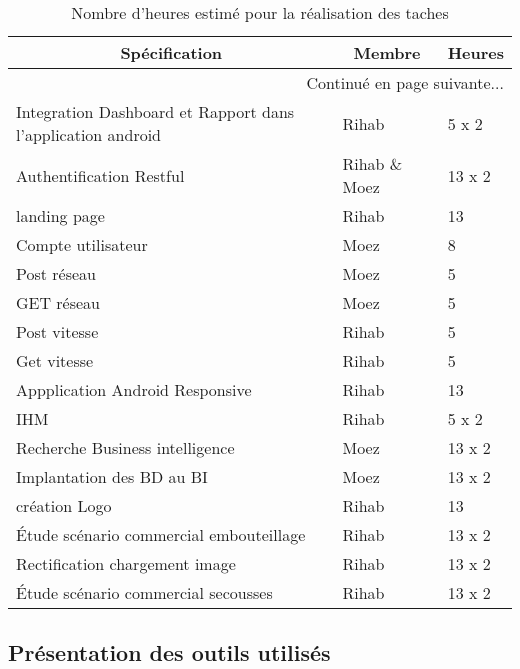 \begin{center}
    \begin{longtable}{| l | l | l |}
        \caption{Nombre d'heures estimé pour la réalisation des taches}
        \label{tab:sprint3-estimation} \\

 \hline
 \multicolumn{1}{|c}{\textbf{Spécification}} &
 \multicolumn{1}{|c}{\textbf{Membre}} &
 \multicolumn{1}{|c|}{\textbf{Heures}} \\ \hline
 \endhead

 \hline \multicolumn{3}{|r|}{{Continué en page suivante$\dotsc$}} \\ \hline
 \endfoot

 \hline \hline
 \endlastfoot

\hline
Integration Dashboard et Rapport dans l'application android & Rihab & 5 x 2 \\ \hline
Authentification Restful& Rihab \& Moez & 13 x 2 \\ \hline
landing page& Rihab & 13 \\ \hline
Compte utilisateur& Moez & 8 \\ \hline
Post réseau& Moez & 5  \\ \hline
GET réseau& Moez & 5  \\ \hline
Post vitesse& Rihab & 5  \\ \hline
Get vitesse& Rihab & 5  \\ \hline
Appplication Android Responsive & Rihab & 13 \\ \hline
IHM & Rihab & 5 x 2 \\ \hline
Recherche Business intelligence& Moez & 13 x 2 \\ \hline
Implantation des BD au BI& Moez & 13 x 2 \\ \hline
création Logo& Rihab & 13 \\ \hline
Étude scénario commercial embouteillage& Rihab & 13 x 2 \\ \hline
Rectification chargement image & Rihab & 13 x 2 \\ \hline
Étude scénario commercial secousses & Rihab & 13 x 2 \\ \hline
\end{longtable}
\end{center}

\subsection{Présentation des outils utilisés}

